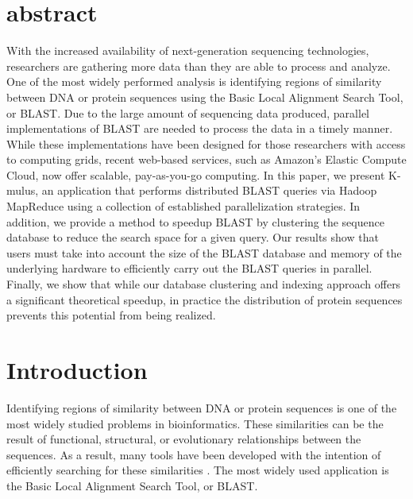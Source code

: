\section{abstract}
With the increased availability of next-generation sequencing technologies, researchers are gathering more data than they are able to process and analyze. One of the most widely performed analysis is identifying regions of similarity between DNA or protein sequences using the Basic Local Alignment Search Tool, or BLAST. Due to the large amount of sequencing data produced, parallel implementations of BLAST are needed to process the data in a timely manner.  While these implementations have been designed for those researchers with access to computing grids, recent web-based services, such as Amazon's Elastic Compute Cloud, now offer scalable, pay-as-you-go computing.  In this paper, we present K-mulus, an application that performs distributed BLAST queries via Hadoop MapReduce using a collection of established parallelization strategies. In addition, we provide a method to speedup BLAST by clustering the sequence database to reduce the search space for a given query.  Our results show that users must take into account the size of the BLAST database and memory of the underlying hardware to efficiently carry out the BLAST queries in parallel.  Finally, we show that while our database clustering and indexing approach offers a significant theoretical speedup, in practice the distribution of protein sequences prevents this potential from being realized.

%
%
\section{Introduction}
Identifying regions of similarity between DNA or protein sequences is one of the most widely studied problems in bioinformatics. These similarities can be the result of functional, structural, or evolutionary relationships between the sequences. As a result, many tools have been developed with the intention of efficiently searching for these similarities \cite{altschul1990basic,eddy2009new,kent2002blat}. The most widely used application is the Basic Local Alignment Search Tool, or BLAST\cite{altschul1990basic}.


